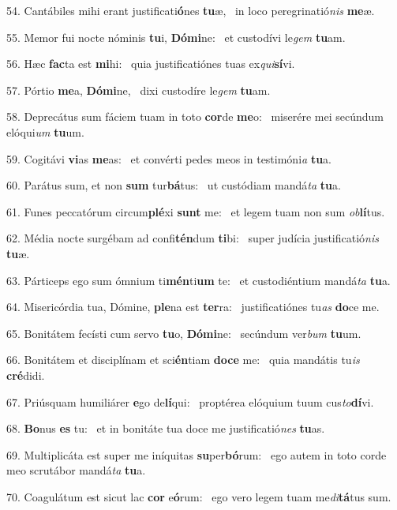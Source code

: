 54. Cantábiles mihi erant justificati\textbf{ó}nes \textbf{tu}æ, \ast\  in loco peregrinatió\textit{nis} \textbf{me}æ.\

55. Memor fui nocte nóminis \textbf{tu}i, \textbf{Dó}\textbf{mi}ne: \ast\  et custodívi le\textit{gem} \textbf{tu}am.\

56. Hæc \textbf{fac}ta est \textbf{mi}hi: \ast\  quia justificatiónes tuas ex\textit{qui}\textbf{sí}vi.\

57. Pórtio \textbf{me}a, \textbf{Dó}\textbf{mi}ne, \ast\  dixi custodíre le\textit{gem} \textbf{tu}am.\

58. Deprecátus sum fáciem tuam in toto \textbf{cor}de \textbf{me}o: \ast\  miserére mei secúndum elóqui\textit{um} \textbf{tu}um.\

59. Cogitávi \textbf{vi}as \textbf{me}as: \ast\  et convérti pedes meos in testimóni\textit{a} \textbf{tu}a.\

60. Parátus sum, et non \textbf{sum} tur\textbf{bá}tus: \ast\  ut custódiam mandá\textit{ta} \textbf{tu}a.\

61. Funes peccatórum circum\textbf{plé}xi \textbf{sunt} me: \ast\  et legem tuam non sum \textit{ob}\textbf{lí}tus.\

62. Média nocte surgébam ad confi\textbf{tén}dum \textbf{ti}bi: \ast\  super judícia justificatió\textit{nis} \textbf{tu}æ.\

63. Párticeps ego sum ómnium ti\textbf{mén}ti\textbf{um} te: \ast\  et custodiéntium mandá\textit{ta} \textbf{tu}a.\

64. Misericórdia tua, Dómine, \textbf{ple}na est \textbf{ter}ra: \ast\  justificatiónes tu\textit{as} \textbf{do}ce me.\

65. Bonitátem fecísti cum servo \textbf{tu}o, \textbf{Dó}\textbf{mi}ne: \ast\  secúndum ver\textit{bum} \textbf{tu}um.\

66. Bonitátem et disciplínam et sci\textbf{én}tiam \textbf{do}\textbf{ce} me: \ast\  quia mandátis tu\textit{is} \textbf{cré}didi.\

67. Priúsquam humiliárer \textbf{e}go de\textbf{lí}qui: \ast\  proptérea elóquium tuum cus\textit{to}\textbf{dí}vi.\

68. \textbf{Bo}nus \textbf{es} tu: \ast\  et in bonitáte tua doce me justificatió\textit{nes} \textbf{tu}as.\

69. Multiplicáta est super me iníquitas \textbf{su}per\textbf{bó}rum: \ast\  ego autem in toto corde meo scrutábor mandá\textit{ta} \textbf{tu}a.\

70. Coagulátum est sicut lac \textbf{cor} e\textbf{ó}rum: \ast\  ego vero legem tuam me\textit{di}\textbf{tá}tus sum.\


